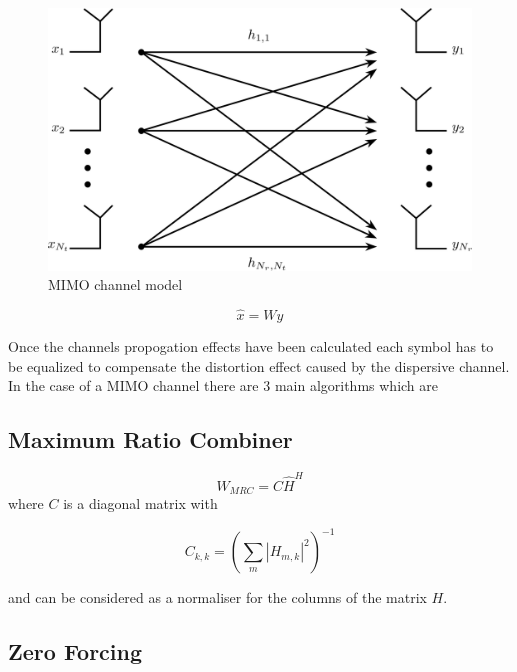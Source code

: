 \begin{figure}[H]
    \begin{center}
        \includegraphics[width=\linewidth]{images/MIMO_Illustration.jpg}
        \caption{MIMO channel model}
        \label{fig:MIMOChannel}
    \end{center}
\end{figure}

\begin{equation}
    \hat{x} = Wy
\end{equation}

Once the channels propogation effects have been calculated each symbol has to be equalized to compensate the distortion effect caused by the dispersive channel. In the case of a MIMO channel there are 3 main algorithms which are

\subsection{Maximum Ratio Combiner}\label{ssec:Simple}

\begin{equation}
    W_{MRC} = C\hat{H}^H
\end{equation}
where $C$ is a diagonal matrix with 

\begin{equation}
    C_{k,k} = \left ( {\sum_{m}} \left | H_{m,k} \right |^2 \right )^{-1}
\end{equation}

and can be considered as a normaliser for the columns of the matrix $H$.

\subsection{Zero Forcing}\label{ssec:ZF}


